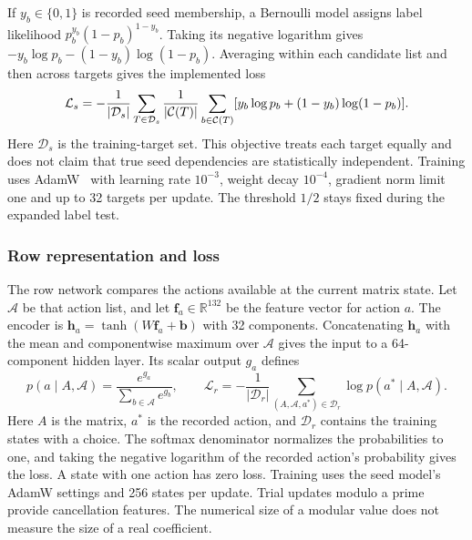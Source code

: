 If $y_b\in\{0,1\}$ is recorded seed membership, a Bernoulli model assigns label likelihood $p_b^{y_b}(1-p_b)^{1-y_b}$. Taking its negative logarithm gives $-y_b\log p_b-(1-y_b)\log(1-p_b)$. Averaging within each candidate list and then across targets gives the implemented loss
\begin{equation}
 \mathcal L_s=-\frac{1}{|\mathcal D_s|}\sum_{T\in\mathcal D_s}
 \frac{1}{|\mathcal C(T)|}\sum_{b\in\mathcal C(T)}
 [y_b\log p_b+(1-y_b)\log(1-p_b)].
 \label{history:eq:seed-loss}
\end{equation}
Here $\mathcal D_s$ is the training-target set. This objective treats each target equally and does not claim that true seed dependencies are statistically independent. Training uses AdamW~\cite{AdamW} with learning rate $10^{-3}$, weight decay $10^{-4}$, gradient norm limit one and up to 32 targets per update. The threshold $1/2$ stays fixed during the expanded label test.

\subsubsection{Row representation and loss}
The row network compares the actions available at the current matrix state. Let $\mathcal A$ be that action list, and let $\boldsymbol f_a\in\mathbb R^{132}$ be the feature vector for action $a$. The encoder is $\boldsymbol h_a=\tanh(W\boldsymbol f_a+\boldsymbol b)$ with 32 components. Concatenating $\boldsymbol h_a$ with the mean and componentwise maximum over $\mathcal A$ gives the input to a 64-component hidden layer. Its scalar output $g_a$ defines
\begin{equation}
 p(a\mid A,\mathcal A)=\frac{e^{g_a}}{\sum_{b\in\mathcal A}e^{g_b}},
 \qquad
 \mathcal L_r=-\frac{1}{|\mathcal D_r|}
       \sum_{(A,\mathcal A,a^*)\in\mathcal D_r}\log p(a^*\mid A,\mathcal A).
 \label{history:eq:row-loss}
\end{equation}
Here $A$ is the matrix, $a^*$ is the recorded action, and $\mathcal D_r$ contains the training states with a choice. The softmax denominator normalizes the probabilities to one, and taking the negative logarithm of the recorded action's probability gives the loss. A state with one action has zero loss. Training uses the seed model's AdamW settings and 256 states per update. Trial updates modulo a prime provide cancellation features. The numerical size of a modular value does not measure the size of a real coefficient.

